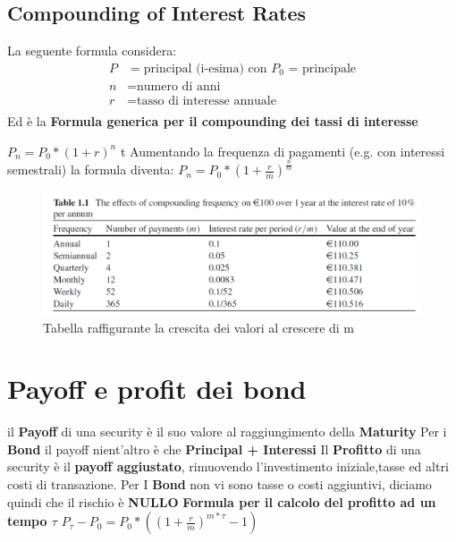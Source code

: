 \documentclass[a4paper,11pt]{report}
\begin{document}
{\subsection{Compounding of Interest Rates}
La seguente formula considera: 
\begin{align*}
P &= \text{principal (i-esima) con $P_0$ = principale} \\
n &= \text{numero di anni}\\
r &= \text{tasso di interesse annuale}\\
\end{align*}
Ed è la \textbf{Formula generica per il compounding dei tassi di interesse} 
\begin{center}
 $P_n=P_0*(1+r)^n$ t \newline
Aumentando la frequenza di pagamenti (e.g. con interessi semestrali) la formula diventa: \newline
 $P_n=P_0*(1+{\frac {r}{m}})^{\frac{n}{m}} $ \newline
\end{center}
\begin{figure}[h!]
\includegraphics[width=\linewidth]{TableInterests.png}
\caption {Tabella raffigurante la crescita dei valori al crescere di m}
\end{figure}
\newpage

\section {Payoff e profit dei bond}
il \textbf{Payoff} di una security è il suo valore al raggiungimento della  \textbf{Maturity } 
Per i \textbf{Bond} il payoff nient'altro è che \textbf{Principal + Interessi} \newline
Il \textbf{Profitto} di una security è il \textbf{payoff aggiustato}, rimuovendo l'investimento iniziale,tasse ed altri costi di transazione. \newline
Per I \textbf{Bond} non vi sono tasse o costi aggiuntivi, diciamo quindi che il rischio è \textbf{NULLO}
\newline \textbf{Formula per il calcolo del profitto ad un tempo $\tau$} \newline
{\LARGE {$P_\tau - P_0 = P_0*((1+{\frac {r}{m}})^{m*\tau}-1)$}}
}
\end{document}
